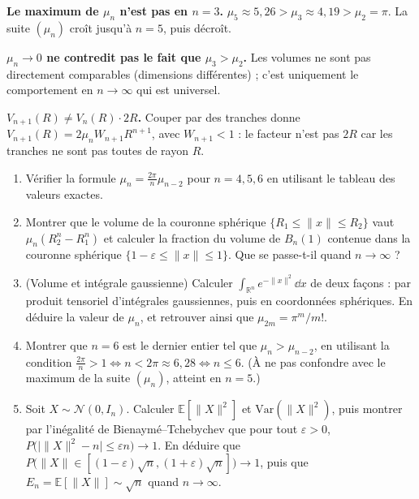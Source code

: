 
\begin{mdframed}[style=cexbar]
  \textbf{Le maximum de $\mu_n$ n'est pas en $n=3$.}\enspace%
  $\mu_5 \approx 5{,}26 > \mu_3 \approx 4{,}19 > \mu_2 = \pi$.
  La suite $(\mu_n)$ croît jusqu'à $n=5$, puis décroît.

  \smallskip\noindent
  \textbf{$\mu_n \to 0$ ne contredit pas le fait que $\mu_3 > \mu_2$.}\enspace%
  Les volumes ne sont pas directement comparables (dimensions différentes) ;
  c'est uniquement le comportement en $n \to \infty$ qui est universel.

  \smallskip\noindent
  \textbf{$V_{n+1}(R) \neq V_n(R) \cdot 2R$.}\enspace%
  Couper par des tranches donne $V_{n+1}(R) = 2\mu_n W_{n+1} R^{n+1}$,
  avec $W_{n+1} < 1$ : le facteur n'est pas $2R$ car les tranches ne sont pas
  toutes de rayon $R$.
\end{mdframed}

\vspace{6pt}
\exolabel

\begin{mdframed}[style=exobar]
  \begin{enumerate}
    \item Vérifier la formule $\mu_n = \frac{2\pi}{n}\mu_{n-2}$ pour $n = 4, 5, 6$
          en utilisant le tableau des valeurs exactes.

    \item Montrer que le volume de la couronne sphérique
          $\{R_1 \leq \|x\| \leq R_2\}$ vaut $\mu_n(R_2^n - R_1^n)$ et
          calculer la fraction du volume de $B_n(1)$ contenue dans la couronne sphérique
          $\{1-\varepsilon \leq \|x\| \leq 1\}$. Que se passe-t-il quand $n\to\infty$ ?

    \item (Volume et intégrale gaussienne) Calculer $\int_{\mathbb{R}^n} e^{-\|x\|^2}\dd x$
          de deux façons : par produit tensoriel d'intégrales gaussiennes, puis en
          coordonnées sphériques. En déduire la valeur de $\mu_n$, et retrouver ainsi
          que $\mu_{2m} = \pi^m/m!$.

    \item Montrer que $n = 6$ est le dernier entier tel que $\mu_n > \mu_{n-2}$,
          en utilisant la condition $\frac{2\pi}{n} > 1 \iff n < 2\pi \approx 6{,}28
          \iff n \leq 6$. (À ne pas confondre avec le maximum de la suite
          $(\mu_n)$, atteint en $n = 5$.)

    \item Soit $X \sim \mathcal{N}(0,I_n)$. Calculer $\mathbb{E}[\|X\|^2]$
          et $\mathrm{Var}(\|X\|^2)$, puis montrer par l'inégalité de
          Bienaymé--Tchebychev que pour tout $\varepsilon > 0$,
          $P\bigl(\bigl|\|X\|^2 - n\bigr| \leq \varepsilon n\bigr) \to 1$.
          En déduire que
          $P\bigl(\|X\| \in [(1-\varepsilon)\sqrt{n}, (1+\varepsilon)\sqrt{n}]\bigr) \to 1$,
          puis que $E_n = \mathbb{E}[\|X\|] \sim \sqrt{n}$ quand $n\to\infty$.
  \end{enumerate}
\end{mdframed}

